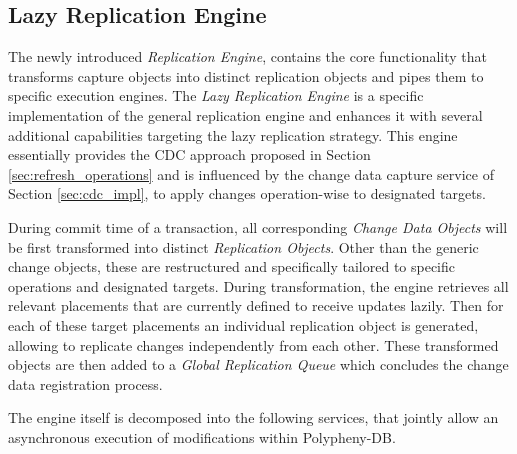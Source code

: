
\subsection{Lazy Replication Engine}
\label{sec:lazy:_engine}

The newly introduced \emph{Replication Engine}, contains the core functionality that transforms capture objects into distinct replication objects and 
pipes them to specific execution engines.
The \emph{Lazy Replication Engine} is a specific implementation of the general replication engine and enhances it with several additional capabilities targeting
the lazy replication strategy. This engine essentially provides the CDC approach proposed in Section \ref{sec:refresh_operations} and is influenced by the 
change data capture service of Section \ref{sec:cdc_impl}, to apply changes operation-wise to designated targets.

During commit time of a transaction, all corresponding \emph{Change Data Objects} will be first transformed into distinct \emph{Replication Objects}. Other than
the generic change objects, these are restructured and specifically tailored to specific operations and designated targets. During transformation, the engine retrieves all 
relevant placements that are currently defined to receive updates lazily. Then for each of these target placements an individual replication object is generated, allowing to 
replicate changes independently from each other. These transformed objects are then added to a \emph{Global Replication Queue} which concludes the change data registration process.


The engine itself is decomposed into the following services, that jointly allow an asynchronous execution of modifications within Polypheny-DB. 

